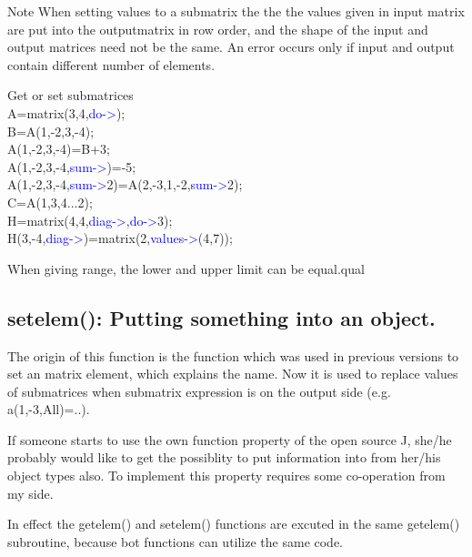 \begin{note}
Note
When setting values to a submatrix the the the values given in input matrix
are put into the outputmatrix in row order, and the shape of the input and output matrices need
not be the same. An error occurs only if input and output contain different number of
elements.
\end{note}
\begin{example}[getset]Get or set submatrices\\
\label{getset}
A=\textcolor{VioletRed}{matrix}(3,4,\textcolor{blue}{do->});\\
B=A(1,-2,3,-4);\\
A(1,-2,3,-4)=B+3;\\
A(1,-2,3,-4,\textcolor{blue}{sum->})=-5;\\
A(1,-2,3,-4,\textcolor{blue}{sum->}2)=A(2,-3,1,-2,\textcolor{blue}{sum->}2);\\
C=A({1,3},{4...2});\\
H=\textcolor{VioletRed}{matrix}(4,4,\textcolor{blue}{diag->},\textcolor{blue}{do->}3);\\
H(3,-4,\textcolor{blue}{diag->})=\textcolor{VioletRed}{matrix}(2,\textcolor{blue}{values->}(4,7));
\end{example}
\begin{note}
When giving range, the lower and upper limit can be equal.qual
\end{note}
\subsection{\textcolor{VioletRed}{setelem}(): Putting something  into an object.}
\label{setelem}
The origin of this function is the function which was used in previous versions
to set an matrix element, which explains the name. Now it is used to replace values
of submatrices when submatrix expression is on the
output side (e.g. a(1,-3,All)=..).
\begin{note}
If someone starts to use the own function property of the open source J, she/he
probably would like to get the possiblity to put information into from her/his object types
also. To implement this property requires some co-operation from my side.
\end{note}
\begin{note}
In effect the \textcolor{VioletRed}{getelem}() and \textcolor{VioletRed}{setelem}() functions are excuted in the same
\textcolor{VioletRed}{getelem}() subroutine, because bot functions can utilize the same code.
\end{note}

